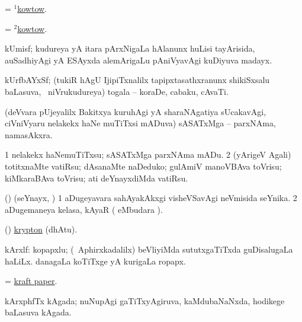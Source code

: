 \bentry
{}
\gl{\nA}
\bmng
 = \hyperlink{kowtow(1)}{$^1$kowtow}. 
\emng
\eentry

\bentry
{}
\gl{\akirx}
\bmng
 = \hyperlink{kowtow(2)}{$^2$kowtow}. 
\emng
\eentry

\bentry
{}
\gl{\nA}
\bmng
kUmisf; kudureya yA itara pArxNigaLa hAlanunx huLisi tayArisida, auSadhiyAgi yA ESAyxda alemArigaLu pAniVyavAgi kuDiyuva madayx. 
\emng
\eentry

\bentry
{}
\gl{\nA}
\bmng
kUrfbAYxSf; (tukiR hAgU IjipiTxnalilx tapipxtasathxranunx shikiSxsalu baLasuva, \kanmu\ niVrukudureya) togala -- koraDe, cabaku, cAvaTi. 
\emng
\eentry

\bentry
{}
\gl{\nA}
\bmng
(deVvara pUjeyalilx Bakitxya kuruhAgi yA sharaNAgatiya sUcakavAgi, ciVniVyaru nelakekx haNe muTiTxsi mADuva) sASATxMga -- parxNAma, namasAkxra. 
\emng
\eentry

\bentry
{}
\gl{\akirx}
\bmng
\bnum
\num{1} nelakekx haNemuTiTxsu; sASATxMga parxNAma mADu. 
\num{2} (yArigeV Agali) totitxnaMte vatiRsu; dAsanaMte naDeduko; gulAmiV manoVBAva toVrisu; kiMkaraBAva toVrisu; ati deYnayxdiMda vatiRsu. 
\enum
\emng
\eentry

\bentry
{}
\gl{\nA}
\bmng
(\ame) (seYnayx, \AmA) 
\bnum
\num{1} aDugeyavara sahAyakAkxgi visheVSavAgi neVmisida seYnika. 
\num{2} aDugemaneya kelasa, kAyaR ( eMbudara \saMkiSx). 
\enum
\emng
\eentry

\bentry
{}
\gl{\saMkiSx}
\bmng
{} 
\emng
\eentry

\bentry
{}
\gl{\saMkeV}
\bmng
(\ravi)  \hyperlink{krypton}{krypton} (dhAtu). 
\emng
\eentry

\bentry
{}
\gl{\nA}
\bmng
kArxlf: 
\banum
{} kopapxlu; (\da\ Aphirxkadalilx) beVliyiMda sututxgaTiTxda guDisalugaLa haLiLx. 
 danagaLa koTiTxge yA kurigaLa ropapx. 
\eanum
\emng
\eentry

\bentry
{}
\gl{\nA}
\bmng
 = \hyperlink{kraft paper}{kraft paper}. 
\emng
\eentry

\bentry
{}
\gl{\nA}
\bmng
kArxphfTx kAgada; nuNupAgi gaTiTxyAgiruva, kaMdubaNaNxda, hodikege baLasuva kAgada. 
\emng
\eentry


